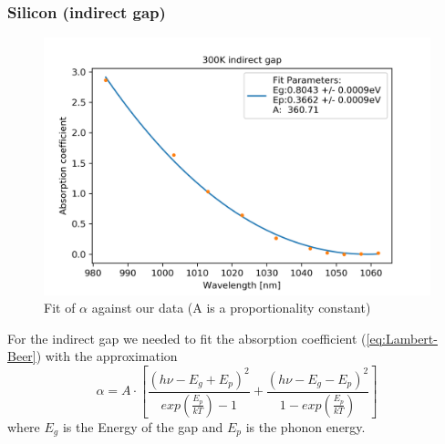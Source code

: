 \documentclass[]{article}
\begin{document}
\subsubsection{Silicon (indirect gap)}
\begin{figure}
	\centering
	\includegraphics[width=0.7\linewidth]{"Plots/300k indirect gap"}
	\caption{Fit of $\alpha$ against our data (A is a proportionality constant)}
	\label{fig:300k-indirect-gap}
\end{figure}

For the indirect gap we needed to fit the absorption coefficient (\ref{eq:Lambert-Beer}) with the approximation
\begin{equation}
\label{fit function}
\alpha = A\cdot \left[ \frac{(h\nu - E_g + E_p)^2}{exp\left(\frac{E_p}{kT}\right) -1} + \frac{(h\nu - E_g - E_p)^2}{1-exp\left(\frac{E_p}{kT}\right)} \right]
\end{equation}
where $E_g$ is the Energy of the gap and $E_p$ is the phonon energy.
\end{document}
